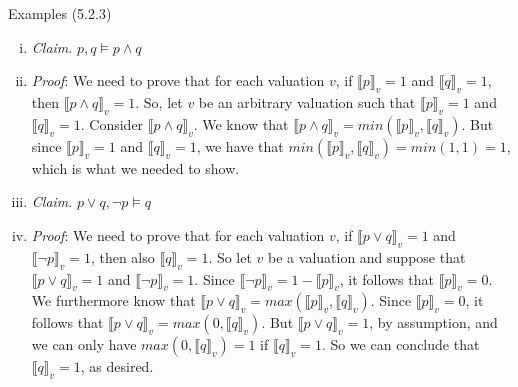 \begin{frame}{Examples (5.2.3)}

	\begin{enumerate}[(i)]
		
			\item \emph{Claim}. $p,q\vDash p\land q$
			
			\item[] \emph{Proof}: We need to prove that for each valuation $v$, if $\llbracket p\rrbracket_v=1$ and $\llbracket q\rrbracket_v=1$, then $\llbracket p\land q\rrbracket_v=1$. So, let $v$ be an arbitrary valuation such that $\llbracket p\rrbracket_v=1$ and $\llbracket q\rrbracket_v=1$. Consider $\llbracket p\land q\rrbracket_v$. We know that $\llbracket p\land q\rrbracket_v=min(\llbracket p\rrbracket_v, \llbracket q\rrbracket_v)$. But since $\llbracket p\rrbracket_v=1$ and $\llbracket q\rrbracket_v=1$, we have that $min(\llbracket p\rrbracket_v, \llbracket q\rrbracket_v)=min(1,1)=1$, which is what we needed to show.
		
		\setcounter{enumi}{3}
		\item \emph{Claim}. $p\lor q, \neg p\vDash q$
			
		\item[] \emph{Proof}: We need to prove that for each valuation $v$, if $\llbracket p\lor q\rrbracket_v=1$ and $\llbracket \neg p\rrbracket_v=1$, then also $\llbracket q\rrbracket_v=1$. So let $v$ be a valuation and suppose that $\llbracket p\lor q\rrbracket_v=1$ and $\llbracket \neg p\rrbracket_v=1$. Since $\llbracket \neg p\rrbracket_v=1-\llbracket p\rrbracket_v$, it follows that $\llbracket p\rrbracket_v=0$. We furthermore know that $\llbracket p\lor q\rrbracket_v=max(\llbracket p\rrbracket_v, \llbracket q\rrbracket_v)$. Since  $\llbracket p\rrbracket_v=0$, it follows that $\llbracket p\lor q\rrbracket_v=max(0, \llbracket q\rrbracket_v)$. But $\llbracket p\lor q\rrbracket_v=1$, by assumption, and we can only have $max(0, \llbracket q\rrbracket_v)=1$ if $\llbracket q\rrbracket_v=1$. So we can conclude that $\llbracket q\rrbracket_v=1$, as desired.


\end{enumerate}

\end{frame}

